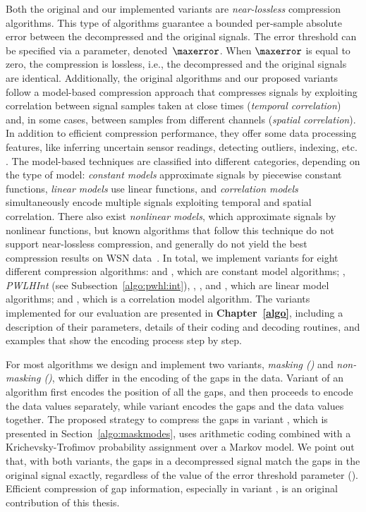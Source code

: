 Both the original and our implemented variants are \textit{near-lossless} compression algorithms. This type of algorithms guarantee a bounded per-sample absolute error between the decompressed and the original signals. The error threshold can be specified via a parameter, denoted~$\maxerror$. When $\maxerror$ is equal to zero, the compression is lossless, i.e., the decompressed and the original signals are identical. Additionally, the original algorithms and our proposed variants follow a model-based compression approach that compresses signals by exploiting correlation between signal samples taken at close times (\textit{temporal correlation}) and, in some cases, between samples from different channels (\textit{spatial correlation}). In addition to efficient compression performance, they offer some data processing features, like inferring uncertain sensor readings, detecting outliers, indexing, etc. \cite{AnEva2013}. The model-based techniques are classified into different categories, depending on the type of model: \textit{constant models} approximate signals by piecewise constant functions, \textit{linear models} use linear functions, and \textit{correlation models} simultaneously encode multiple signals exploiting temporal and spatial correlation. There also exist \textit{nonlinear models}, which approximate signals by nonlinear functions, but known algorithms that follow this technique do not support near-lossless compression, and generally do not yield the best compression results on WSN data~\cite{AnEva2013, Signal2016}. In total, we implement variants for eight different compression algorithms: \textit{\PCAfull} \cite{coder:pca} and \textit{\APCAfull} \cite{coder:apca}, which are constant model algorithms; \textit{\PWLHfull} \cite{coder:pwlh}, \textit{PWLHInt} (see Subsection~\ref{algo:pwhl:int}), \textit{\CAfull} \cite{coder:ca}, \textit{\SFfull} \cite{coder:sf}, and \textit{\FRfull} \cite{coder:fr}, which are linear model algorithms; and \textit{\GAMPSfull} \cite{coder:gamps}, which is a correlation model algorithm. The variants implemented for our evaluation are presented in \textbf{Chapter~\ref{algo}}, including a description of their parameters, details of their coding and decoding routines, and examples that show the encoding process step by step.


For most algorithms we design and implement two variants, \textit{masking (\maskalgo)} and \textit{non-masking (\NOmaskalgo)}, which differ in the encoding of the gaps in the data. Variant \maskalgo of an algorithm first encodes the position of all the gaps, and then proceeds to encode the data values separately, while variant \NOmaskalgo encodes the gaps and the data values together. The proposed strategy to compress the gaps in variant \maskalgo, which is presented in Section~\ref{algo:maskmodes}, uses arithmetic coding \cite{ac2, Cover2005} combined with a Krichevsky-Trofimov probability assignment \cite{ktestimator} over a Markov model. We point out that, with both variants, the gaps in a decompressed signal match the gaps in the original signal exactly, regardless of the value of the error threshold parameter (\maxerror). Efficient compression of gap information, especially in variant \maskalgo, is an original contribution of this thesis.


